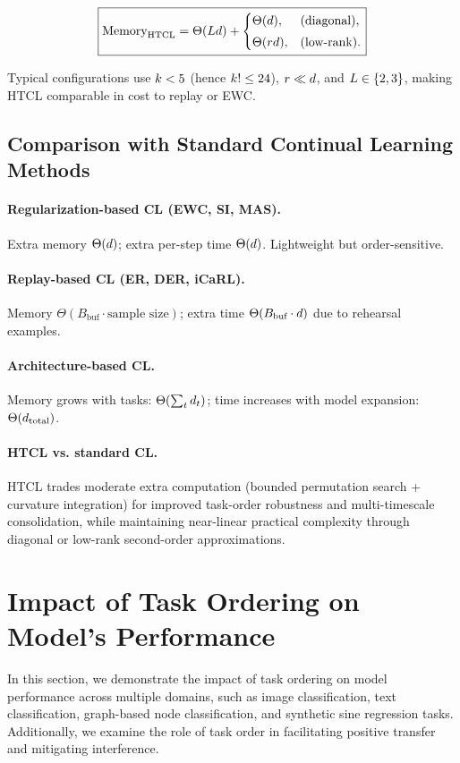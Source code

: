 \[
\boxed{
\text{Memory}_{\mathrm{HTCL}}
=
\Theta(L d)
+
\begin{cases}
\Theta(d), & \text{(diagonal)},\\[3pt]
\Theta(rd), & \text{(low-rank)}.
\end{cases}
}
\]

Typical configurations use  
$k < 5$ (hence $k!\le 24$),  
$r \ll d$,  
and $L \in \{2,3\}$,  
making HTCL comparable in cost to replay or EWC.

\subsection{Comparison with Standard Continual Learning Methods}

\paragraph{Regularization-based CL (EWC, SI, MAS).}  
Extra memory $\Theta(d)$; extra per-step time $\Theta(d)$. Lightweight but order-sensitive.

\paragraph{Replay-based CL (ER, DER, iCaRL).}  
Memory $\Theta(B_{\text{buf}}\cdot\text{sample size})$;  
extra time $\Theta(B_{\text{buf}}\cdot d)$ due to rehearsal examples.

\paragraph{Architecture-based CL.}  
Memory grows with tasks: $\Theta(\sum_t d_t)$;  
time increases with model expansion: $\Theta(d_{\text{total}})$.

\paragraph{HTCL vs. standard CL.}  
HTCL trades moderate extra computation (bounded permutation search + curvature integration)  
for improved task-order robustness and multi-timescale consolidation, while maintaining  
near-linear practical complexity through diagonal or low-rank second-order approximations.

\section{Impact of Task Ordering on Model's Performance}
\label{app: task-order-impact}
In this section, we demonstrate the impact of task ordering on model performance across multiple domains, such as image classification, text classification, graph-based node classification, and synthetic sine regression tasks. Additionally, we examine the role of task order in facilitating positive transfer and mitigating interference.

